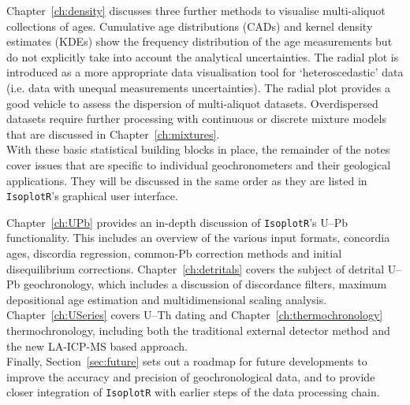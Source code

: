 Chapter~\ref{ch:density} discusses three further methods to visualise
multi-aliquot collections of ages. Cumulative age distributions (CADs)
and kernel density estimates (KDEs) show the frequency distribution of
the age measurements but do not explicitly take into account the
analytical uncertainties. The radial plot is introduced as a more
appropriate data visualisation tool for `heteroscedastic' data
(i.e. data with unequal measurements uncertainties). The radial plot
provides a good vehicle to assess the dispersion of multi-aliquot
datasets. Overdispersed datasets require further processing with
continuous or discrete mixture models that are discussed in
Chapter~\ref{ch:mixtures}.\\

With these basic statistical building blocks in place, the remainder
of the notes cover issues that are specific to individual
geochronometers and their geological applications. They will be
discussed in the same order as they are listed in \texttt{IsoplotR}'s
graphical user interface.

Chapter~\ref{ch:UPb} provides an in-depth discussion of
\texttt{IsoplotR}'s U--Pb functionality. This includes an overview of
the various input formats, concordia ages, discordia regression,
common-Pb correction methods and initial disequilibrium corrections.
Chapter~\ref{ch:detritals} covers the subject of detrital U--Pb
geochronology, which includes a discussion of discordance filters,
maximum depositional age estimation and multidimensional scaling
analysis. Chapter~\ref{ch:USeries} covers U--Th dating and
Chapter~\ref{ch:thermochronology} thermochronology, including both the
traditional external detector method and the new LA-ICP-MS based
approach.\\

Finally, Section~\ref{sec:future} sets out a roadmap for future
developments to improve the accuracy and precision of geochronological
data, and to provide closer integration of \texttt{IsoplotR} with
earlier steps of the data processing chain.
